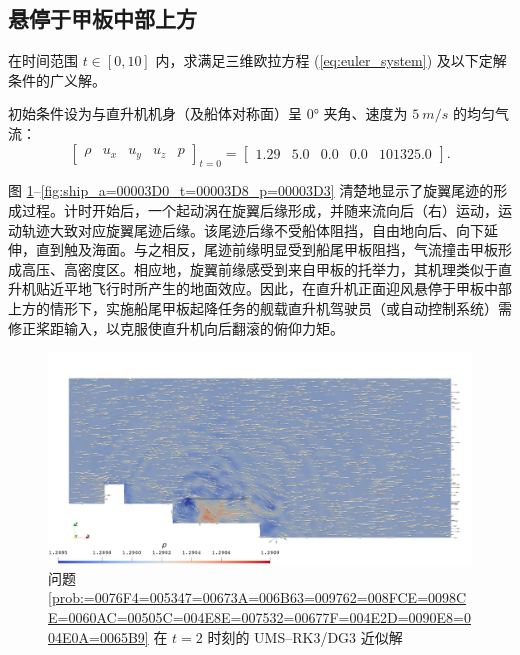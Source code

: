 \subsection{悬停于甲板中部上方}
\begin{problem}
[直升机正面迎风悬停于甲板中部上方]\label{prob:=0076F4=005347=00673A=006B63=009762=008FCE=0098CE=0060AC=00505C=004E8E=007532=00677F=004E2D=0090E8=004E0A=0065B9}在时间范围
$t\in[0,10]$ 内，求满足三维欧拉方程 (\ref{eq:euler_system}) 及以下定解条件的广义解。

初始条件设为与直升机机身（及船体对称面）呈 $\ang{0}$ 夹角、速度为 $\SI{5}{m/s}$ 的均匀气流：
\begin{equation}
\begin{bmatrix}\rho & u_{x} & u_{y} & u_{z} & p\end{bmatrix}_{t=0}=\begin{bmatrix}1.29 & 5.0 & 0.0 & 0.0 & 101325.0\end{bmatrix}.
\end{equation}
\end{problem}

\newpage{}

图 \ref{fig:ship_a=00003D0_t=00003D2_p=00003D3}–\ref{fig:ship_a=00003D0_t=00003D8_p=00003D3}
清楚地显示了旋翼尾迹的形成过程。计时开始后，一个起动涡在旋翼后缘形成，并随来流向后（右）运动，运动轨迹大致对应旋翼尾迹后缘。该尾迹后缘不受船体阻挡，自由地向后、向下延伸，直到触及海面。与之相反，尾迹前缘明显受到船尾甲板阻挡，气流撞击甲板形成高压、高密度区。相应地，旋翼前缘感受到来自甲板的托举力，其机理类似于直升机贴近平地飞行时所产生的地面效应。因此，在直升机正面迎风悬停于甲板中部上方的情形下，实施船尾甲板起降任务的舰载直升机驾驶员（或自动控制系统）需修正桨距输入，以克服使直升机向后翻滚的俯仰力矩。

\begin{figure}[h!]
\begin{centering}
\includegraphics[width=1\textwidth,height=0.4\textheight,keepaspectratio]{figures/ship/a=0_p=3/Frame20}
\par\end{centering}
\caption{\label{fig:ship_a=00003D0_t=00003D2_p=00003D3}问题 \ref{prob:=0076F4=005347=00673A=006B63=009762=008FCE=0098CE=0060AC=00505C=004E8E=007532=00677F=004E2D=0090E8=004E0A=0065B9}
在 $t=2$ 时刻的 UMS–RK3/DG3 近似解}
\end{figure}

